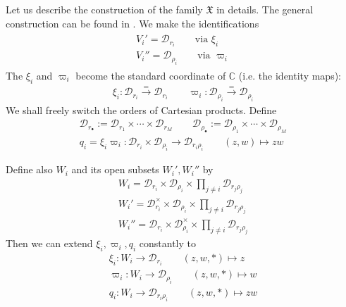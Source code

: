 \documentclass[11pt,b5paper,notitlepage]{article}
\theoremstyle{definition}
\theoremstyle{plain}
\newcommand{\mc}{\mathcal}
\newcommand{\wht}{\widehat}
\newcommand{\blt}{\bullet}
\newcommand{\Cbb}{\mathbb C}
\newcommand{\<}{\left\langle}
\renewcommand{\>}{\right\rangle}
\newcommand{\fx}{\mathfrak{X}}
\newcommand{\MD}{\mathcal{D}}
\numberwithin{equation}{subsection}
\begin{document}
Let us describe the construction of the family $\fx$ in details. The general construction can be found in \cite[Sec. 3]{Gui-sewingconvergence}. We make the identifications
\begin{gather}\label{eq22}
\begin{gathered}
V_i'=\mc D_{r_i}\qquad \text{via }\xi_i\\
V_i''=\mc D_{\rho_i}\qquad \text{via }\varpi_i
\end{gathered}
\end{gather}
The $\xi_i$ and $\varpi_i$ become  the standard coordinate of $\Cbb$ (i.e. the identity maps):
\begin{gather*}
\xi_i:\mc D_{r_i}\xrightarrow{=}\mc D_{r_i}\qquad \varpi_i:\mc D_{\rho_i}\xrightarrow{=}\mc D_{\rho_i}
\end{gather*}
We shall freely switch the orders of Cartesian products. Define 
\begin{gather*}
    \MD_{r_\blt}:=\MD_{r_1}\times \cdots \times \MD_{r_M}\qquad\MD_{\rho_\blt}:=\MD_{\rho_1}\times \cdots \times \MD_{\rho_M}\\
q_i=\xi_i\varpi_i:\MD_{r_i}\times \MD_{\rho_i}\rightarrow \MD_{r_i\rho_i}\qquad (z,w)\mapsto zw
\end{gather*}
\begin{comment}
Clearly, for each $1\leq i\leq R$, $q_{\blt\backslash i}:=(q_1,\cdots, \wht{q_{i}},\cdots ,q_R)$ is a coordinate of
\begin{align*}
  q_{\blt\backslash i}:=(q_1,\cdots, \wht{q_{i}},\cdots ,q_R)  \prod_{j\ne i} \MD_{r_j\rho_j}\rightarrow 
\end{align*}
for each $1\leq i\leq R$. 
\end{comment}
Define also $W_i$ and its open subsets $W_i',W_i''$ by
\begin{subequations}\label{eq44}
\begin{gather}
W_i=\MD_{r_i}\times\MD_{\rho_i}\times \prod_{j\ne i} \MD_{r_j\rho_j}\\
W_i'=\MD_{r_i}^\times \times \MD_{\rho_i}\times \prod_{j\ne i} \MD_{r_j\rho_j}\\
W_i''=\MD_{r_i} \times \MD_{\rho_i}^\times\times \prod_{j\ne i} \MD_{r_j\rho_j}
\end{gather}
\end{subequations}
Then we can extend $\xi_i,\varpi_i,q_i$ constantly to 
\begin{subequations}\label{eq29}
\begin{gather}
    \xi_i:W_i\rightarrow \MD_{r_i}  \qquad (z,w,*)\mapsto z\\
    \varpi_i:W_i\rightarrow \MD_{\rho_i}\qquad (z,w,*)\mapsto w\\
q_i:W_i\rightarrow \MD_{r_i\rho_i} \qquad (z,w,*)\mapsto zw
\end{gather}
\end{subequations}
\end{document}
